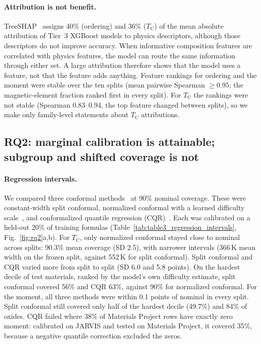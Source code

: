 \documentclass[pdflatex,sn-nature]{sn-jnl}
\newcommand{\Tc}{\ensuremath{T_\mathrm{C}}}
\begin{document}
\paragraph{Attribution is not benefit.} TreeSHAP~\cite{lundberg2017shap,lundberg2020treeshap} assigns 40\% (ordering) and 36\% (\Tc{}) of the mean absolute attribution of Tier~3 XGBoost models to physics descriptors, although those descriptors do not improve accuracy. When informative composition features are correlated with physics features, the model can route the same information through either set. A large attribution therefore shows that the model uses a feature, not that the feature adds anything. Feature rankings for ordering and the moment were stable over the ten splits (mean pairwise Spearman $\geq0.95$; the magnetic-element fraction ranked first in every split). For \Tc{} the rankings were not stable (Spearman 0.83--0.94, the top feature changed between splits), so we make only family-level statements about \Tc{} attributions.

\subsection{RQ2: marginal calibration is attainable; subgroup and shifted coverage is not}\label{sec:rq2}

\paragraph{Regression intervals.} We compared three conformal methods~\cite{vovk2005algorithmic,lei2018distribution,angelopoulos2023gentle} at 90\% nominal coverage. These were constant-width split conformal, normalized conformal with a learned difficulty scale~\cite{papadopoulos2011normalized}, and conformalized quantile regression (CQR)~\cite{romano2019cqr}. Each was calibrated on a held-out 20\% of training formulas (Table~\ref{tab:table3_regression_intervals}, Fig.~\ref{fig:rq2}a,b). For \Tc{}, only normalized conformal stayed close to nominal across splits: 90.3\% mean coverage (SD 2.5), with narrower intervals (366\,K mean width on the frozen split, against 552\,K for split conformal). Split conformal and CQR varied more from split to split (SD 6.0 and 5.8 points). On the hardest decile of test materials, ranked by the model's own difficulty estimate, split conformal covered 56\% and CQR 63\%, against 90\% for normalized conformal. For the moment, all three methods were within 0.1 points of nominal in every split. Split conformal still covered only half of the hardest decile (49.7\%) and 84\% of oxides. CQR failed where 38\% of Materials Project rows have exactly zero moment: calibrated on JARVIS and tested on Materials Project, it covered 35\%, because a negative quantile correction excluded the zeros.
\end{document}

